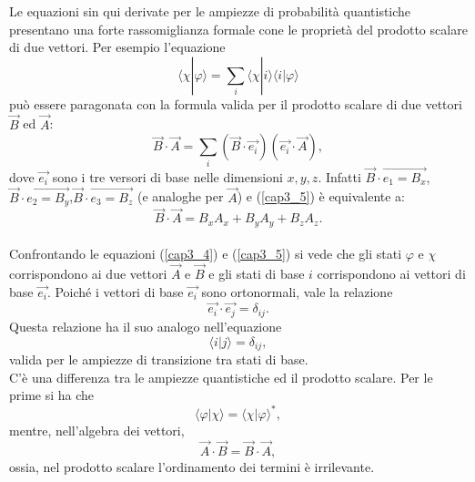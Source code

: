 Le equazioni sin qui derivate per le ampiezze di probabilità quantistiche presentano una forte rassomiglianza formale cone le proprietà del prodotto scalare di due vettori. Per esempio l'equazione
	\begin{equation}
		\langle \chi | \varphi \rangle =\sum \limits_{i}\langle \chi | i \rangle \langle i | \varphi \rangle
	\label{cap3_4}
	\end{equation}
può essere paragonata con la formula valida per il prodotto scalare di due vettori $\vec{B}$ ed $\vec{A}$:
	\begin{equation}
		\vec{B} \cdot \vec{A}= \sum \limits_{i} (\vec{B} \cdot  \vec{e_i})(\vec{e_i} \cdot \vec{A}) ,
	\label{cap3_5}
	\end{equation}
dove $\vec{e_i}$ sono i tre versori di base nelle dimensioni $x,y,z$. Infatti $\vec{B}\cdot \vec{e_1=B_x}$, $\vec{B}\cdot \vec{e_2=B_y}$,$\vec{B}\cdot \vec{e_3=B_z}$ (e analoghe per  $\vec{A}$) e (\eqref{cap3_5}) è equivalente a:
	\begin{equation}
		\vec{B} \cdot \vec{A} = B_xA_x+B_yA_y+B_zA_z .
	\end{equation}\\
	
Confrontando le equazioni (\ref{cap3_4}) e (\ref{cap3_5}) si vede che gli stati $\varphi$ e $\chi$ corrispondono ai due vettori $\vec{A}$ e $\vec{B}$ e gli stati di base $i$ corrispondono ai vettori di base $\vec{e_i}$. Poiché i vettori di base $\vec{e_i}$ sono ortonormali, vale la relazione
	\begin{equation}
		\vec{e_i} \cdot \vec{e_j}= \delta_{ij} .
	\end{equation}
Questa relazione ha il suo analogo nell'equazione
	\begin{equation}
		\langle i | j \rangle = \delta_{ij} ,
	\end{equation}
valida per le ampiezze di transizione tra stati di base.\\

C'è una differenza tra le ampiezze quantistiche ed il prodotto scalare. Per le prime si ha che
	\begin{equation}
		\langle \varphi | \chi \rangle = \langle \chi | \varphi\rangle ^* ,
	\label{cap3_6}
	\end{equation} 
mentre, nell'algebra dei vettori, 
	\begin{equation}
		\vec{A} \cdot \vec{B}= \vec{B} \cdot \vec{A} ,
	\label{cap3_7}
	\end{equation}
ossia, nel prodotto scalare l'ordinamento dei termini è irrilevante.\\

